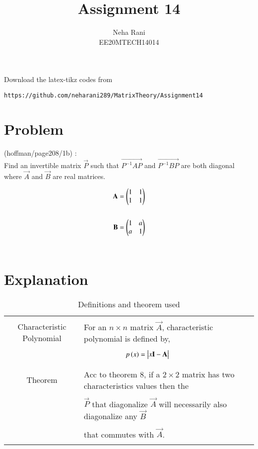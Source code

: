 \documentclass[journal,12pt]{IEEEtran}
\begin{document}
     \def\rightbox#1{\makebox[0in][r]{#1}}
     \def\centbox#1{\makebox[0in]{#1}}
     \def\topbox#1{\raisebox{-\baselineskip}[0in][0in]{#1}}
     \def\midbox#1{\raisebox{-0.5\baselineskip}[0in][0in]{#1}}
\vspace{3cm}
\title{Assignment 14}
\author{Neha Rani\\EE20MTECH14014}
\maketitle
\bigskip
\renewcommand{\thefigure}{\theenumi}
\renewcommand{\thetable}{\theenumi}
%
Download the latex-tikz codes from 
%
\begin{lstlisting}
https://github.com/neharani289/MatrixTheory/Assignment14
\end{lstlisting}
\section{\textbf{Problem}}
(hoffman/page208/1b) : \\
%
Find an invertible matrix $\vec{P}$ such that $\vec{P^{-1}AP}$ and $\vec{P^{-1}BP}$ are both diagonal where $\vec{A}$ and $\vec{B}$ are real matrices.

\begin{align}
    \Vec{A}=\myvec{1&1\\1&1}\\ 
   \nonumber \\ 
    \vec{B}=\myvec{1&a\\a&1}
\end{align}
\bigskip\\
\section{\textbf{Explanation}}
\renewcommand{\thetable}{1}
\begin{table}[ht!]
\centering
\begin{tabular}{|c|l|}
    \hline
	\multirow{3}{*}{Characteristic Polynomial} 
	& \\
	& For an $n\times n$ matrix $\vec{A}$, characteristic polynomial is defined by,\\
	&\\
	& $\qquad\qquad\qquad p\brak{x}=\mydet{x\Vec{I}-\Vec{A}}$\\
	&\\
	\hline
	\multirow{3}{*}{Theorem}
    &\\
    & Acc to theorem 8, if a $2\times 2$ matrix has two characteristics values then the \\
    &\\
    & $\vec{P}$ that diagonalize $\vec{A}$ will
    necessarily also diagonalize any $\vec{B}$ \\
    &\\
    & that commutes with $\vec{A}$. \\
    &\\
    \hline
\end{tabular}
\label{table:1}
    \caption{Definitions and theorem used}
\end{table}
\newpage
\end{document}
